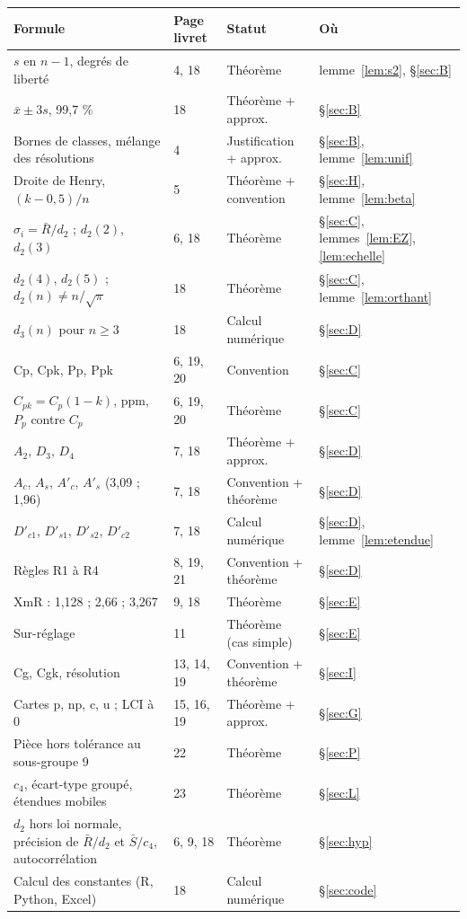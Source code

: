 \documentclass[11pt,a4paper]{article}
\theoremstyle{tq}
\theoremstyle{remark}
\newcommand{\Rb}{\bar{R}}
\begin{document}
\begin{center}\small
\begin{tabular}{@{}>{\raggedright\arraybackslash}p{5.4cm}p{1.6cm}p{3.6cm}p{4.2cm}@{}}
\toprule
Formule & Page livret & Statut & Où \\
\midrule
$s$ en $n-1$, degrés de liberté & 4, 18 & Théorème & lemme~\ref{lem:s2}, §\ref{sec:B}\\
$\bar x\pm3s$, 99,7 \% & 18 & Théorème + approx. & §\ref{sec:B}\\
Bornes de classes, mélange des résolutions & 4 & Justification + approx. & §\ref{sec:B}, lemme~\ref{lem:unif}\\
Droite de Henry, $(k-0{,}5)/n$ & 5 & Théorème + convention & §\ref{sec:H}, lemme~\ref{lem:beta}\\
$\hat\sigma_i=\Rb/d_2$ ; $d_2(2)$, $d_2(3)$ & 6, 18 & Théorème & §\ref{sec:C}, lemmes~\ref{lem:EZ}, \ref{lem:echelle}\\
$d_2(4)$, $d_2(5)$ ; $d_2(n)\neq n/\sqrt\pi$ & 18 & Théorème & §\ref{sec:C}, lemme~\ref{lem:orthant}\\
$d_3(n)$ pour $n\ge3$ & 18 & Calcul numérique & §\ref{sec:D}\\
Cp, Cpk, Pp, Ppk & 6, 19, 20 & Convention & §\ref{sec:C}\\
$C_{pk}=C_p(1-k)$, ppm, $P_p$ contre $C_p$ & 6, 19, 20 & Théorème & §\ref{sec:C}\\
$A_2$, $D_3$, $D_4$ & 7, 18 & Théorème + approx. & §\ref{sec:D}\\
$A_c$, $A_s$, $A'_c$, $A'_s$ (3,09 ; 1,96) & 7, 18 & Convention + théorème & §\ref{sec:D}\\
$D'_{c1}$, $D'_{s1}$, $D'_{s2}$, $D'_{c2}$ & 7, 18 & Calcul numérique & §\ref{sec:D}, lemme~\ref{lem:etendue}\\
Règles R1 à R4 & 8, 19, 21 & Convention + théorème & §\ref{sec:D}\\
XmR : 1,128 ; 2,66 ; 3,267 & 9, 18 & Théorème & §\ref{sec:E}\\
Sur-réglage & 11 & Théorème (cas simple) & §\ref{sec:E}\\
Cg, Cgk, résolution & 13, 14, 19 & Convention + théorème & §\ref{sec:I}\\
Cartes p, np, c, u ; LCI à 0 & 15, 16, 19 & Théorème + approx. & §\ref{sec:G}\\
Pièce hors tolérance au sous-groupe 9 & 22 & Théorème & §\ref{sec:P}\\
$c_4$, écart-type groupé, étendues mobiles & 23 & Théorème & §\ref{sec:L}\\
$d_2$ hors loi normale, précision de $\Rb/d_2$ et $\bar S/c_4$, autocorrélation & 6, 9, 18 & Théorème & §\ref{sec:hyp}\\
Calcul des constantes (R, Python, Excel) & 18 & Calcul numérique & §\ref{sec:code}\\
\bottomrule
\end{tabular}
\end{center}
\end{document}
